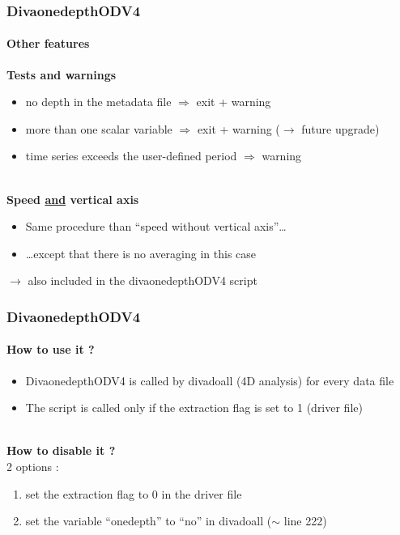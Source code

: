 \begin{frame}
\frametitle{DivaonedepthODV4}
\framesubtitle{Other features}
\textbf{Tests and warnings}
\begin{itemize}
 \item no depth in the metadata file $\Rightarrow$ exit + warning
 \item more than one scalar variable $\Rightarrow$ exit + warning ($\rightarrow$ future upgrade)
 \item time series exceeds the user-defined period $\Rightarrow$ warning
\end{itemize}

~\\
\textbf{Speed \underline{and} vertical axis}
\begin{itemize}
 \item Same procedure than ``speed without vertical axis''\ldots
 \item \ldots except that there is no averaging in this case
\end{itemize}
$\rightarrow$ also included in the divaonedepthODV4 script



\end{frame}
\begin{frame}
\frametitle{DivaonedepthODV4}
\framesubtitle{How to use it ?}
\begin{itemize}
 \item DivaonedepthODV4 is called by divadoall (4D analysis) for every data file
 \item The script is called only if the extraction flag is set to 1 (driver file)
\end{itemize}

~\\
\textbf{How to disable it ?} \\
2 options :
\begin{enumerate}
 \item set the extraction flag to 0 in the driver file
 \item set the variable ``onedepth'' to ``no'' in divadoall ($\sim$ line 222)
\end{enumerate}

\end{frame}
